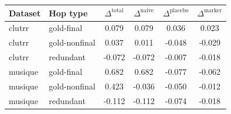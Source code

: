 \begin{tabular}{llcccc}
\toprule
Dataset & Hop type & $\Delta^{\text{total}}$ & $\Delta^{\text{naive}}$ & $\Delta^{\text{placebo}}$ & $\Delta^{\text{marker}}$ \\
\midrule
clutrr & gold-final & 0.079 & 0.079 & 0.036 & 0.023 \\
clutrr & gold-nonfinal & 0.037 & 0.011 & -0.048 & -0.029 \\
clutrr & redundant & -0.072 & -0.072 & -0.007 & -0.018 \\
musique & gold-final & 0.682 & 0.682 & -0.077 & -0.062 \\
musique & gold-nonfinal & 0.423 & -0.036 & -0.050 & -0.012 \\
musique & redundant & -0.112 & -0.112 & -0.074 & -0.018 \\
\bottomrule
\end{tabular}
